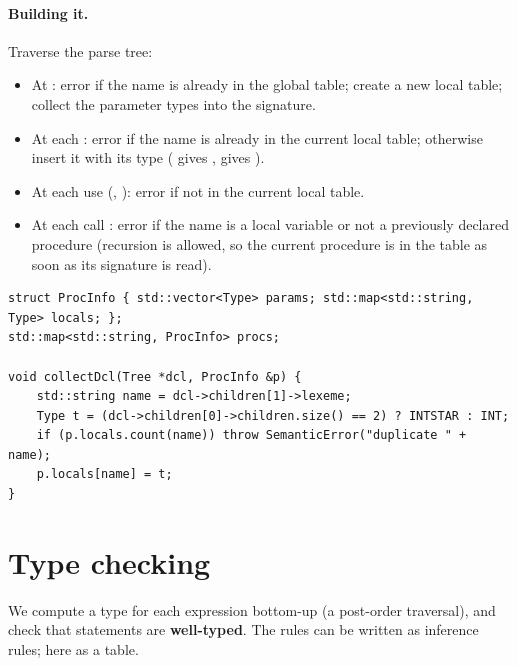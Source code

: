 \paragraph{Building it.} Traverse the parse tree:
\begin{itemize}
  \item At : error if the name is already in the global table; create a new
        local table; collect the parameter types into the signature.
  \item At each : error if the name is already in the current local table;
        otherwise insert it with its type ( gives ,
         gives ).
  \item At each use (, ): error if not in the current
        local table.
  \item At each call : error if the name is a local variable or not a
        previously declared procedure (recursion is allowed, so the current procedure is in
        the table as soon as its signature is read).
\end{itemize}

\begin{lstlisting}[style=cpp]
struct ProcInfo { std::vector<Type> params; std::map<std::string, Type> locals; };
std::map<std::string, ProcInfo> procs;

void collectDcl(Tree *dcl, ProcInfo &p) {
    std::string name = dcl->children[1]->lexeme;
    Type t = (dcl->children[0]->children.size() == 2) ? INTSTAR : INT;
    if (p.locals.count(name)) throw SemanticError("duplicate " + name);
    p.locals[name] = t;
}
\end{lstlisting}

\section{Type checking}

We compute a type for each expression bottom-up (a post-order traversal), and check that
statements are \textbf{well-typed}. The rules can be written as inference rules; here as a
table.

